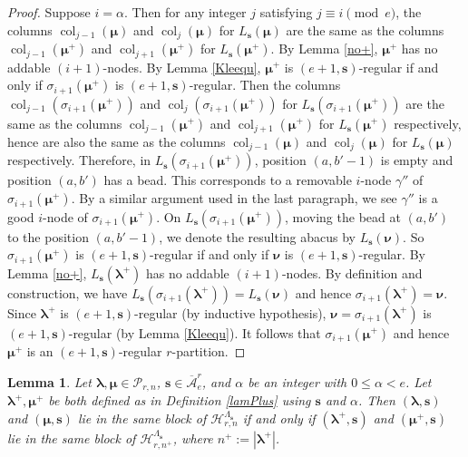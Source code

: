 \documentclass[a4paper,10pt]{amsart}
\theoremstyle{plain}
\renewcommand{\H}{\mathcal{H}}
\def\bs{{\boldsymbol{s}}}
\def\Lam{\Lambda}
\def\PP{\mathscr{P}}
\def\blam{{\boldsymbol \lambda}}
\def\bmu{{\boldsymbol \mu}}
\def\bnu{{\boldsymbol \nu}}
\DeclareMathOperator{\col}{col}
\theoremstyle{plain}
\newtheorem{lemma}[theorem]{Lemma}
\numberwithin{equation}{section}
\begin{document}
\begin{proof}
Suppose $i=\alpha$. Then for any integer $j$ satisfying $j\equiv i\pmod e$, the columns $\col_{j-1}(\bmu)$ and $\col_j(\bmu)$ for $L_\bs(\bmu)$ are the same as the columns $\col_{j-1}(\bmu^+)$ and $\col_{j+1}(\bmu^+)$ for
$L_{\bs}(\bmu^+)$. By Lemma \ref{no+}, $\bmu^+$ has no addable $(i+1)$-nodes. By Lemma \ref{Kleequ}, $\bmu^+$ is $(e+1,\bs)$-regular if and only if $\sigma_{i+1}(\bmu^+)$ is  $(e+1,\bs)$-regular.
Then the columns $\col_{j-1}(\sigma_{i+1}(\bmu^+))$ and $\col_j(\sigma_{i+1}(\bmu^+))$ for $L_\bs(\sigma_{i+1}(\bmu^+))$ are the same as the columns $\col_{j-1}(\bmu^+)$ and $\col_{j+1}(\bmu^+)$ for $L_\bs(\bmu^+)$ respectively, hence are also the same as the columns $\col_{j-1}(\bmu)$ and $\col_j(\bmu)$ for $L_\bs(\bmu)$ respectively. Therefore, in $L_\bs (\sigma_{i+1}(\bmu^+))$, position $(a, b'-1)$ is empty and position $(a, b')$ has a bead. This corresponds to a removable $i$-node $\gamma''$ of $\sigma_{i+1}(\bmu^+)$. By a similar argument used in the last paragraph, we see $\gamma''$ is  a good $i$-node of $\sigma_{i+1}(\bmu^+)$. On $L_\mathbf{s}(\sigma_{i+1}(\boldsymbol{\mu}^+))$, moving the bead at $(a, b')$ to the position $(a, b'-1)$, we denote the resulting abacus by $L_\mathbf{s}(\boldsymbol{\nu})$.
So $\sigma_{i+1}(\bmu^+)$ is $(e+1,\bs)$-regular if and only if $\bnu$ is $(e+1,\bs)$-regular. By Lemma \ref{no+}, $L_\mathbf{s}(\boldsymbol{\lambda}^+)$ has no addable $(i+1)$-nodes. By definition and construction, we have $L_\bs (\sigma_{i+1} (\blam^+))=L_\bs (\bnu)$ and hence $\sigma_{i+1} (\blam^+)=\bnu$. Since ${\blam}^+$ is $(e+1,\bs)$-regular (by inductive hypothesis), $\bnu=\sigma_{i+1}(\blam^+)$ is $(e+1,\bs)$-regular (by Lemma \ref{Kleequ}). It follows that $\sigma_{i+1}(\bmu^+)$ and hence $\bmu^+$ is an $(e+1,\bs)$-regular $r$-partition.
\end{proof}

\begin{lemma} Let $\blam,\bmu\in\PP_{r,n}$, $\bs\in \overline{\mathcal A}^r_e$, and $\alpha$ be an integer with $0\le \alpha<e$. Let $\blam^+,\bmu^+$ be both defined as in Definition \ref{lamPlus} using $\bs$ and $\alpha$.
Then
$(\blam,\bs)$ and $(\bmu,\bs)$ lie in the same block of ${\H}_{r,n}^{\Lam_\bs}$ if and only if $(\blam^+,\bs)$ and $(\bmu^+,\bs)$ lie in the same block of ${\H}_{r,n^{+}}^{\Lam_\bs}$, where $n^+:=|\blam^+|$.
\end{lemma}
\end{document}
